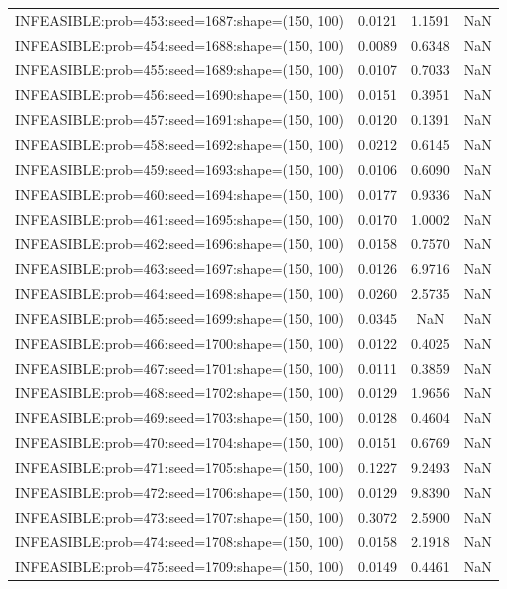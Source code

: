 \begin{longtable}{lccc}
INFEASIBLE:prob=453:seed=1687:shape=(150, 100) & 0.0121 &  1.1591 &    NaN \\
INFEASIBLE:prob=454:seed=1688:shape=(150, 100) & 0.0089 &  0.6348 &    NaN \\
INFEASIBLE:prob=455:seed=1689:shape=(150, 100) & 0.0107 &  0.7033 &    NaN \\
INFEASIBLE:prob=456:seed=1690:shape=(150, 100) & 0.0151 &  0.3951 &    NaN \\
INFEASIBLE:prob=457:seed=1691:shape=(150, 100) & 0.0120 &  0.1391 &    NaN \\
INFEASIBLE:prob=458:seed=1692:shape=(150, 100) & 0.0212 &  0.6145 &    NaN \\
INFEASIBLE:prob=459:seed=1693:shape=(150, 100) & 0.0106 &  0.6090 &    NaN \\
INFEASIBLE:prob=460:seed=1694:shape=(150, 100) & 0.0177 &  0.9336 &    NaN \\
INFEASIBLE:prob=461:seed=1695:shape=(150, 100) & 0.0170 &  1.0002 &    NaN \\
INFEASIBLE:prob=462:seed=1696:shape=(150, 100) & 0.0158 &  0.7570 &    NaN \\
INFEASIBLE:prob=463:seed=1697:shape=(150, 100) & 0.0126 &  6.9716 &    NaN \\
INFEASIBLE:prob=464:seed=1698:shape=(150, 100) & 0.0260 &  2.5735 &    NaN \\
INFEASIBLE:prob=465:seed=1699:shape=(150, 100) & 0.0345 &     NaN &    NaN \\
INFEASIBLE:prob=466:seed=1700:shape=(150, 100) & 0.0122 &  0.4025 &    NaN \\
INFEASIBLE:prob=467:seed=1701:shape=(150, 100) & 0.0111 &  0.3859 &    NaN \\
INFEASIBLE:prob=468:seed=1702:shape=(150, 100) & 0.0129 &  1.9656 &    NaN \\
INFEASIBLE:prob=469:seed=1703:shape=(150, 100) & 0.0128 &  0.4604 &    NaN \\
INFEASIBLE:prob=470:seed=1704:shape=(150, 100) & 0.0151 &  0.6769 &    NaN \\
INFEASIBLE:prob=471:seed=1705:shape=(150, 100) & 0.1227 &  9.2493 &    NaN \\
INFEASIBLE:prob=472:seed=1706:shape=(150, 100) & 0.0129 &  9.8390 &    NaN \\
INFEASIBLE:prob=473:seed=1707:shape=(150, 100) & 0.3072 &  2.5900 &    NaN \\
INFEASIBLE:prob=474:seed=1708:shape=(150, 100) & 0.0158 &  2.1918 &    NaN \\
INFEASIBLE:prob=475:seed=1709:shape=(150, 100) & 0.0149 &  0.4461 &    NaN \\

\end{longtable}
